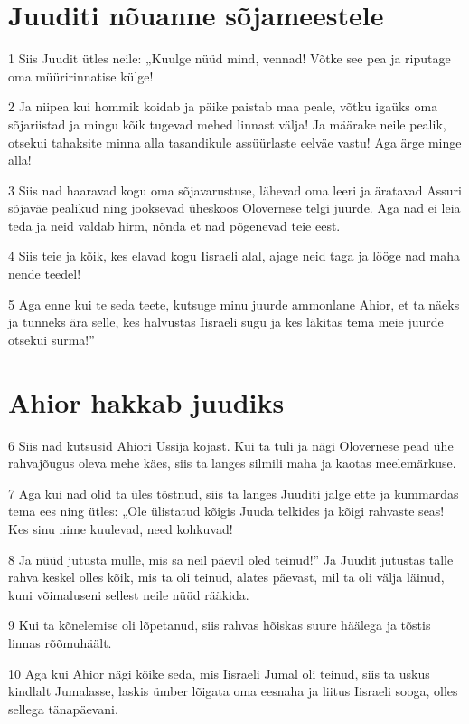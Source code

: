 \section*{Juuditi nõuanne sõjameestele}

\par 1 Siis Juudit ütles neile: „Kuulge nüüd mind, vennad! Võtke see pea ja riputage oma müüririnnatise külge!
\par 2 Ja niipea kui hommik koidab ja päike paistab maa peale, võtku igaüks oma sõjariistad ja mingu kõik tugevad mehed linnast välja! Ja määrake neile pealik, otsekui tahaksite minna alla tasandikule assüürlaste eelväe vastu! Aga ärge minge alla!
\par 3 Siis nad haaravad kogu oma sõjavarustuse, lähevad oma leeri ja äratavad Assuri sõjaväe pealikud ning jooksevad üheskoos Olovernese telgi juurde. Aga nad ei leia teda ja neid valdab hirm, nõnda et nad põgenevad teie eest.
\par 4 Siis teie ja kõik, kes elavad kogu Iisraeli alal, ajage neid taga ja lööge nad maha nende teedel!
\par 5 Aga enne kui te seda teete, kutsuge minu juurde ammonlane Ahior, et ta näeks ja tunneks ära selle, kes halvustas Iisraeli sugu ja kes läkitas tema meie juurde otsekui surma!”

\section*{Ahior hakkab juudiks}

\par 6 Siis nad kutsusid Ahiori Ussija kojast. Kui ta tuli ja nägi Olovernese pead ühe rahvajõugus oleva mehe käes, siis ta langes silmili maha ja kaotas meelemärkuse.
\par 7 Aga kui nad olid ta üles tõstnud, siis ta langes Juuditi jalge ette ja kummardas tema ees ning ütles: „Ole ülistatud kõigis Juuda telkides ja kõigi rahvaste seas! Kes sinu nime kuulevad, need kohkuvad!
\par 8 Ja nüüd jutusta mulle, mis sa neil päevil oled teinud!” Ja Juudit jutustas talle rahva keskel olles kõik, mis ta oli teinud, alates päevast, mil ta oli välja läinud, kuni võimaluseni sellest neile nüüd rääkida.
\par 9 Kui ta kõnelemise oli lõpetanud, siis rahvas hõiskas suure häälega ja tõstis linnas rõõmuhäält.
\par 10 Aga kui Ahior nägi kõike seda, mis Iisraeli Jumal oli teinud, siis ta uskus kindlalt Jumalasse, laskis ümber lõigata oma eesnaha ja liitus Iisraeli sooga, olles sellega tänapäevani.


